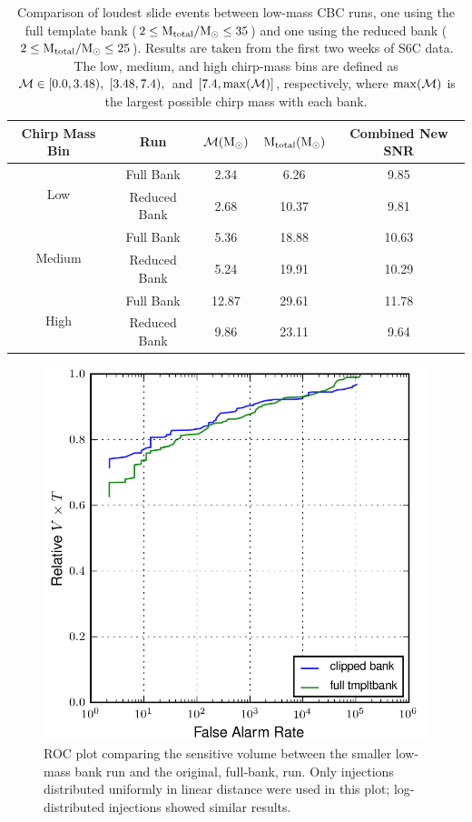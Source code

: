 \begin{table}[p]
\label{tab:smalller_bank_investigation-loudest_slides}
\center
\begin{tabular}{| c | c | c | c | c |}
\hline
Chirp Mass Bin & Run & $\mathcal{M} (\mathrm{M_\odot})$ & $\mathrm{M_{total}} (\mathrm{M_\odot})$ & Combined New \ac{SNR} \\ 
\hline \hline
\multirow{2}{*}{Low} & Full Bank & 2.34 & 6.26 & 9.85 \\
                     & Reduced Bank & 2.68 & 10.37 & 9.81 \\
\hline
\multirow{2}{*}{Medium} & Full Bank & 5.36 & 18.88 & 10.63 \\
                        & Reduced Bank & 5.24 & 19.91 & 10.29 \\
\hline
\multirow{2}{*}{High}   & Full Bank & 12.87 & 29.61 & 11.78 \\
                        & Reduced Bank & 9.86 & 23.11 & 9.64 \\
\hline
\end{tabular}
\caption{Comparison of loudest slide events between low-mass \ac{CBC} runs, one using the full template bank ($2 \leq \mathrm{M_{total}}/\mathrm{M_\odot} \leq 35$) and one using the reduced bank ($2 \leq \mathrm{M_{total}}/\mathrm{M_\odot} \leq 25$). Results are taken from the first two weeks of S6C data. The low, medium, and high chirp-mass bins are defined as $\mathcal{M} \in [0.0, 3.48), ~[3.48, 7.4),$ and $[7.4, \max(\mathcal{M})]$, respectively, where $\max(\mathcal{M})$ is the largest possible chirp mass with each bank.}
\end{table}

\begin{figure}[p]
\center
\label{fig:smaller_bank_investigation-roc}
\includegraphics[width=5in]{figures/lower_tmpltbank_investigation/lowmass-lininj_compare_ROC.png}
\caption{ROC plot comparing the sensitive volume between the smaller low-mass bank run and the original, full-bank, run. Only injections distributed uniformly in linear distance were used in this plot; log-distributed injections showed similar results.}
\end{figure}

